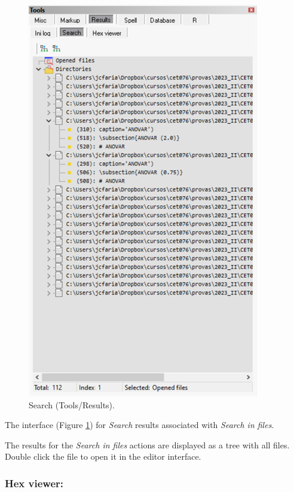 \begin{figure}[H]
  \includegraphics[scale=0.35]{./res/tools_results_search.png}
  \caption{Search (Tools/Results).}
  \label{fig:tools_results_search}
\end{figure}

The interface
(Figure \ref{fig:tools_results_search})
for \textit{Search} results associated with \textit{Search in files}.

The results for the \textit{Search in files} actions are displayed
as a tree with all files. Double click the file to open it in
the editor interface.


\subsubsection{Hex viewer:}\\


